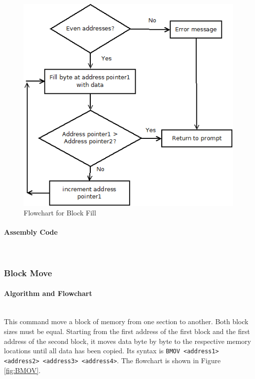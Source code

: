 \documentclass[12pt]{article}
\begin{document}
			
\begin{figure}[H]
\centering
\includegraphics[width=0.7\linewidth]{BF}
\caption{Flowchart for Block Fill}
\label{fig:BF}
\end{figure}
			\paragraph{Assembly Code}~\\
			
			\subsubsection{Block Move}
			
			
			
			\paragraph{Algorithm and Flowchart}~\\
			This command move a block of memory from one section to another. Both block sizes must be equal. Starting from the first address of the first block and the first address of the second block, it moves data byte by byte to the respective memory locations until all data has been copied. Its syntax is \texttt{BMOV <address1> <address2> <address3> <address4>}. The flowchart is shown in Figure \ref{fig:BMOV}.
			
\end{document}

